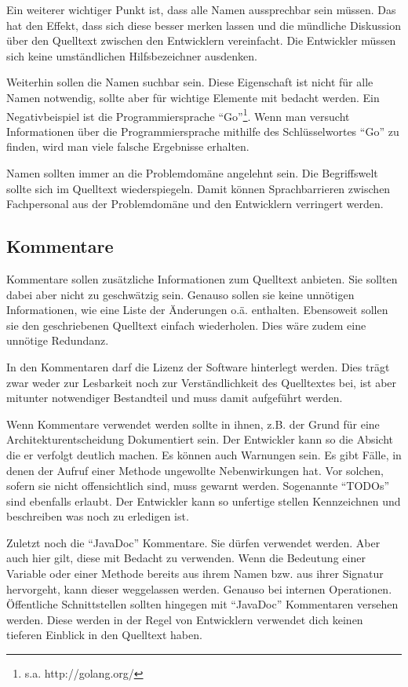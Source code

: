 Ein weiterer wichtiger Punkt ist, dass alle Namen aussprechbar sein müssen. Das hat den Effekt, dass sich diese besser merken lassen und die mündliche Diskussion über den Quelltext zwischen den Entwicklern vereinfacht. Die Entwickler müssen sich keine umständlichen Hilfsbezeichner ausdenken.

Weiterhin sollen die Namen suchbar sein. Diese Eigenschaft ist nicht für alle Namen notwendig, sollte aber für wichtige Elemente mit bedacht werden. Ein Negativbeispiel ist die Programmiersprache \enquote{Go}\footnote{s.a. http://golang.org/}. Wenn man versucht Informationen über die Programmiersprache mithilfe des Schlüsselwortes \enquote{Go} zu finden, wird man viele falsche Ergebnisse erhalten.

Namen sollten immer an die Problemdomäne angelehnt sein. Die Begriffswelt sollte sich im Quelltext wiederspiegeln. Damit können Sprachbarrieren zwischen Fachpersonal aus der Problemdomäne und den Entwicklern verringert werden.

\subsection{Kommentare}
Kommentare sollen zusätzliche Informationen zum Quelltext anbieten. Sie sollten dabei aber nicht zu geschwätzig sein. Genauso sollen sie keine unnötigen Informationen, wie eine Liste der Änderungen o.ä. enthalten. Ebensoweit sollen sie den geschriebenen Quelltext einfach wiederholen. Dies wäre zudem eine unnötige Redundanz.

In den Kommentaren darf die Lizenz der Software hinterlegt werden. Dies trägt zwar weder zur Lesbarkeit noch zur Verständlichkeit des Quelltextes bei, ist aber mitunter notwendiger Bestandteil und muss damit aufgeführt werden.

Wenn Kommentare verwendet werden sollte in ihnen, z.B. der Grund für eine Architekturentscheidung Dokumentiert sein. Der Entwickler kann so die Absicht die er verfolgt deutlich machen. Es können auch Warnungen sein. Es gibt Fälle, in denen der Aufruf einer Methode ungewollte Nebenwirkungen hat. Vor solchen, sofern sie nicht offensichtlich sind, muss gewarnt werden. Sogenannte \enquote{TODOs} sind ebenfalls erlaubt. Der Entwickler kann so unfertige stellen Kennzeichnen und beschreiben was noch zu erledigen ist.

Zuletzt noch die \enquote{JavaDoc} Kommentare. Sie dürfen verwendet werden. Aber auch hier gilt, diese mit Bedacht zu verwenden. Wenn die Bedeutung einer Variable oder einer Methode bereits aus ihrem Namen bzw. aus ihrer Signatur hervorgeht, kann dieser weggelassen werden. Genauso bei internen Operationen. Öffentliche Schnittstellen sollten hingegen mit \enquote{JavaDoc} Kommentaren versehen werden. Diese werden in der Regel von Entwicklern verwendet dich keinen tieferen Einblick in den Quelltext haben.


